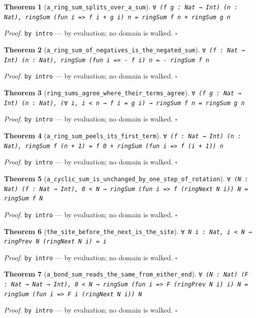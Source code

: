 \documentclass[11pt]{article}
\newtheorem{theorem}{Theorem}[section]
\begin{document}
\begin{theorem}[\texttt{a\_ring\_sum\_splits\_over\_a\_sum}]
\texttt{∀ (f g : Nat → Int) (n : Nat), ringSum (fun i => f i + g i) n = ringSum f n + ringSum g n}
\end{theorem}
\noindent\emph{Proof.} \texttt{by
  intro} --- by evaluation; no domain is walked. \hfill$\square$

\begin{theorem}[\texttt{a\_ring\_sum\_of\_negatives\_is\_the\_negated\_sum}]
\texttt{∀ (f : Nat → Int) (n : Nat), ringSum (fun i => - f i) n = - ringSum f n}
\end{theorem}
\noindent\emph{Proof.} \texttt{by
  intro} --- by evaluation; no domain is walked. \hfill$\square$

\begin{theorem}[\texttt{ring\_sums\_agree\_where\_their\_terms\_agree}]
\texttt{∀ (f g : Nat → Int) (n : Nat), (∀ i, i < n → f i = g i) → ringSum f n = ringSum g n}
\end{theorem}
\noindent\emph{Proof.} \texttt{by
  intro} --- by evaluation; no domain is walked. \hfill$\square$

\begin{theorem}[\texttt{a\_ring\_sum\_peels\_its\_first\_term}]
\texttt{∀ (f : Nat → Int) (n : Nat), ringSum f (n + 1) = f 0 + ringSum (fun i => f (i + 1)) n}
\end{theorem}
\noindent\emph{Proof.} \texttt{by
  intro} --- by evaluation; no domain is walked. \hfill$\square$

\begin{theorem}[\texttt{a\_cyclic\_sum\_is\_unchanged\_by\_one\_step\_of\_rotation}]
\texttt{∀ (N : Nat) (f : Nat → Int), 0 < N → ringSum (fun i => f (ringNext N i)) N = ringSum f N}
\end{theorem}
\noindent\emph{Proof.} \texttt{by
  intro} --- by evaluation; no domain is walked. \hfill$\square$

\begin{theorem}[\texttt{the\_site\_before\_the\_next\_is\_the\_site}]
\texttt{∀ N i : Nat, i < N → ringPrev N (ringNext N i) = i}
\end{theorem}
\noindent\emph{Proof.} \texttt{by
  intro} --- by evaluation; no domain is walked. \hfill$\square$

\begin{theorem}[\texttt{a\_bond\_sum\_reads\_the\_same\_from\_either\_end}]
\texttt{∀ (N : Nat) (F : Nat → Nat → Int), 0 < N → ringSum (fun i => F (ringPrev N i) i) N = ringSum (fun i => F i (ringNext N i)) N}
\end{theorem}
\noindent\emph{Proof.} \texttt{by
  intro} --- by evaluation; no domain is walked. \hfill$\square$
\end{document}
